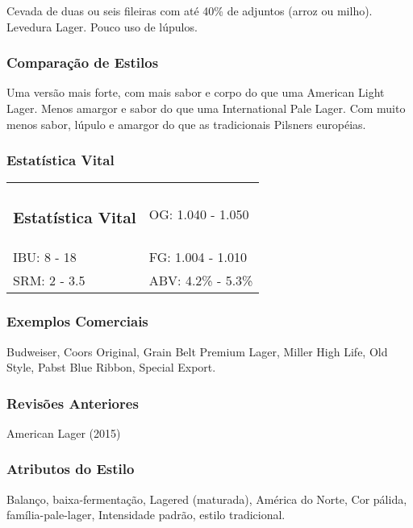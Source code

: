 \begin{multicols}{2}
Cevada de duas ou seis fileiras com até 40\% de adjuntos (arroz ou milho). Levedura Lager. Pouco uso de lúpulos.

\subsubsection*{Comparação de Estilos}

Uma versão mais forte, com mais sabor e corpo do que uma American Light Lager. Menos amargor e sabor do que uma International Pale Lager. Com muito menos sabor, lúpulo e amargor do que as tradicionais Pilsners européias.

\subsubsection*{Estatística Vital}

\begin{tabular}{@{}ll@{}}
\subsubsection*{Estatística Vital} & OG: 1.040 - 1.050 \\
IBU: 8 - 18 & FG: 1.004 - 1.010 \\
SRM: 2 - 3.5 & ABV: 4.2\% - 5.3\%
\end{tabular}

\subsubsection*{Exemplos Comerciais}

Budweiser, Coors Original, Grain Belt Premium Lager, Miller High Life, Old Style, Pabst Blue Ribbon, Special Export.

\subsubsection*{Revisões Anteriores}
American Lager (2015)

\subsubsection*{Atributos do Estilo}

Balanço, baixa-fermentação, Lagered (maturada), América do Norte, Cor pálida, família-pale-lager, Intensidade padrão, estilo tradicional.

\end{multicols}